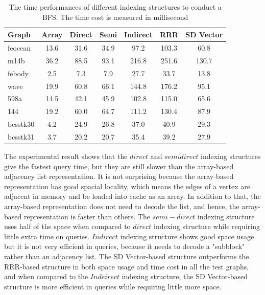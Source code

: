 \documentclass[12pt,glossary]{dalthesis}
\begin{document}
\begin{table}[ht]
\centering
\caption{The time performances of different indexing structures to conduct a BFS. The time cost is measured in millisecond}
\label{my-label}
\begin{tabular}{|l||c||c||c||c||c||c|}
\hline
Graph    & Array & Direct & Semi & Indirect & RRR & SD Vector \\ \hline
feocean  &   13.6    &   31.6     &   34.9   &    97.2      &  103.3   & 60.8          \\
m14b     &   36.2    &    88.5    &   93.1   &   216.8   &  251.6   &   130.7        \\
febody   &   2.5    &    7.3    &   7.9   &     27.7    &   33.7  &     13.8      \\
wave     &    19.9   &    60.8    &   66.1   &    144.8     &   176.2  &   95.1        \\
598a     &    14.5   &    42.1    &   45.9   &    102.8     &  115.0   &    65.6       \\
144      &   19.2    &    60.0    &   64.7   &     111.2     &  130.4   &  87.9         \\
bcsstk30 &   4.2    &    24.9    &   26.8   &    37.0    &   40.9  &  29.3         \\
bcsstk31 &    3.7   &    20.2    &   20.7   &     35.4    &   39.2  &  27.9         \\ \hline
\end{tabular}
\end{table}

\bigskip

The experimental result shows that the $direct$ and $semi direct$ indexing structures give the fastest query time, but they are still slower than the array-based adjacency list representation. It is not surprising because the array-based representation has good spacial locality, which means the edges of a vertex are adjacent in memory and be loaded into cache as an array. In addition to that, the array-based representation does not need to decode the list, and hence, the array-based representation is faster than others. The $semi-direct$ indexing structure uses half of the space when compared to $direct$ indexing structure while requiring little extra time on queries. $Indirect$ indexing structure shows good space usage but it is not very efficient in queries, because it needs to decode a "subblock" rather than an adjacency list. The SD Vector-based structure outperforms the RRR-based structure in both space usage and time cost in all the test graphs, and when compared to the $Indeirect$ indexing structure, the SD Vector-based structure is more efficient in queries while requiring little more space.   
\end{document}
